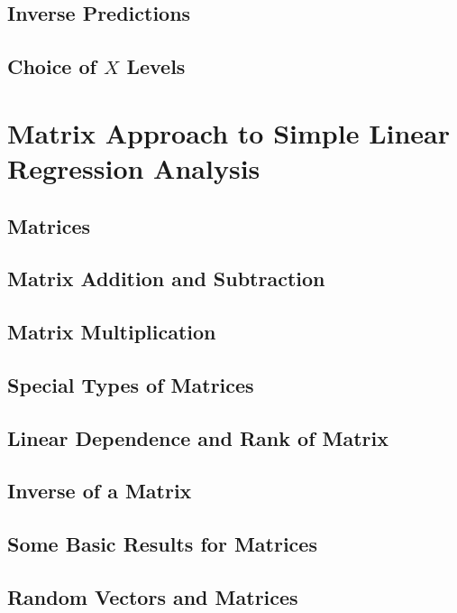 \subsection{Inverse Predictions}

\subsection{Choice of $X$ Levels}


\section{Matrix Approach to Simple Linear Regression Analysis}
\subsection{Matrices}

\subsection{Matrix Addition and Subtraction}

\subsection{Matrix Multiplication}

\subsection{Special Types of Matrices}

\subsection{Linear Dependence and Rank of Matrix}

\subsection{Inverse of a Matrix}

\subsection{Some Basic Results for Matrices}

\subsection{Random Vectors and Matrices}

